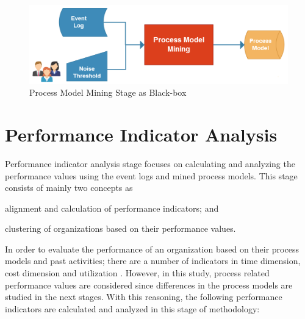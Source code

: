 \begin{figure}
  \centering
  \includegraphics[width=\textwidth]{4_methodology/process-model-mining-blackbox}
  \caption{Process Model Mining Stage as Black-box }
  \label{fig:process-model-mining-blackbox}
\end{figure}


\section{Performance Indicator Analysis}
\label{sec:performance-indicator-analysis}
Performance indicator analysis stage focuses on calculating and analyzing the performance values using the event logs and mined process models. This stage consists of mainly two concepts as 
\begin{inparaenum}
\item alignment and calculation of performance indicators; and
\item clustering of organizations based on their performance values.
\end{inparaenum}
In order to evaluate the performance of an organization based on their process models and past activities; there are a number of indicators in time dimension, cost dimension and utilization \cite{van2011process}. However, in this study, process related performance values are considered since differences in the process models are studied in the next stages. With this reasoning, the following performance indicators are calculated and analyzed in this stage of methodology:

